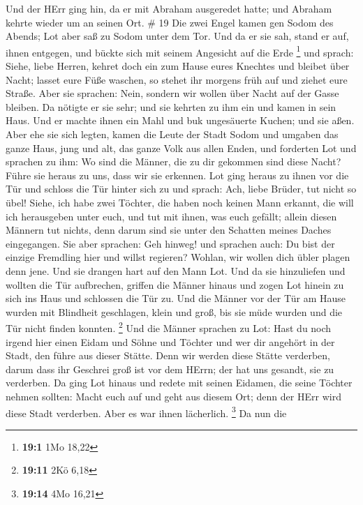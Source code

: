 Und der HErr ging hin, da er mit Abraham ausgeredet hatte;
und Abraham kehrte wieder um an seinen Ort. \# 19  Die zwei
Engel kamen gen Sodom des Abends; Lot aber saß zu Sodom unter dem Tor.
Und da er sie sah, stand er auf, ihnen entgegen, und bückte sich mit
seinem Angesicht auf die Erde \footnote{\textbf{19:1} 1Mo 18,22}
 und sprach: Siehe, liebe Herren, kehret doch ein zum Hause
eures Knechtes und bleibet über Nacht; lasset eure Füße waschen, so
stehet ihr morgens früh auf und ziehet eure Straße. Aber sie sprachen:
Nein, sondern wir wollen über Nacht auf der Gasse bleiben. 
Da nötigte er sie sehr; und sie kehrten zu ihm ein und kamen in sein
Haus. Und er machte ihnen ein Mahl und buk ungesäuerte Kuchen; und sie
aßen.  Aber ehe sie sich legten, kamen die Leute der Stadt
Sodom und umgaben das ganze Haus, jung und alt, das ganze Volk aus allen
Enden,  und forderten Lot und sprachen zu ihm: Wo sind die
Männer, die zu dir gekommen sind diese Nacht? Führe sie heraus zu uns,
dass wir sie erkennen.  Lot ging heraus zu ihnen vor die Tür
und schloss die Tür hinter sich zu  und sprach: Ach, liebe
Brüder, tut nicht so übel!  Siehe, ich habe zwei Töchter,
die haben noch keinen Mann erkannt, die will ich herausgeben unter euch,
und tut mit ihnen, was euch gefällt; allein diesen Männern tut nichts,
denn darum sind sie unter den Schatten meines Daches eingegangen.
 Sie aber sprachen: Geh hinweg! und sprachen auch: Du bist
der einzige Fremdling hier und willst regieren? Wohlan, wir wollen dich
übler plagen denn jene. Und sie drangen hart auf den Mann Lot. Und da
sie hinzuliefen und wollten die Tür aufbrechen,  griffen
die Männer hinaus und zogen Lot hinein zu sich ins Haus und schlossen
die Tür zu.  Und die Männer vor der Tür am Hause wurden mit
Blindheit geschlagen, klein und groß, bis sie müde wurden und die Tür
nicht finden konnten. \footnote{\textbf{19:11} 2Kö 6,18} 
Und die Männer sprachen zu Lot: Hast du noch irgend hier einen Eidam und
Söhne und Töchter und wer dir angehört in der Stadt, den führe aus
dieser Stätte.  Denn wir werden diese Stätte verderben,
darum dass ihr Geschrei groß ist vor dem HErrn; der hat uns gesandt, sie
zu verderben.  Da ging Lot hinaus und redete mit seinen
Eidamen, die seine Töchter nehmen sollten: Macht euch auf und geht aus
diesem Ort; denn der HErr wird diese Stadt verderben. Aber es war ihnen
lächerlich. \footnote{\textbf{19:14} 4Mo 16,21}  Da nun die
